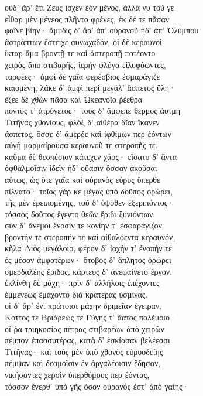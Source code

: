 \begin{pages}
\begin{Leftside}
\quad{}οὐδ' ἄρ' ἔτι Ζεὺς ἴσχεν ἑὸν μένος, ἀλλά νυ τοῦ γε\\
εἶθαρ μὲν μένεος πλῆντο φρένες, ἐκ δέ τε πᾶσαν\\
φαῖνε βίην· ἄμυδις δ' ἄρ' ἀπ' οὐρανοῦ ἠδ' ἀπ' Ὀλύμπου \\
ἀστράπτων ἔστειχε συνωχαδόν, οἱ δὲ κεραυνοὶ  \\
ἴκταρ ἅμα βροντῇ τε καὶ ἀστεροπῇ ποτέοντο\\
χειρὸς ἄπο στιβαρῆς, ἱερὴν φλόγα εἰλυφόωντες, \\
ταρφέες· ἀμφὶ δὲ γαῖα φερέσβιος ἐσμαράγιζε \\
καιομένη, λάκε δ' ἀμφὶ περὶ μεγάλ' ἄσπετος ὕλη·\\
ἔζεε δὲ χθὼν πᾶσα καὶ Ὠκεανοῖο ῥέεθρα \\
πόντός τ' ἀτρύγετος· τοὺς δ' ἄμφεπε θερμὸς ἀυτμὴ \\
Τιτῆνας χθονίους, φλὸξ δ' αἰθέρα δῖαν ἵκανεν\\
ἄσπετος, ὄσσε δ' ἄμερδε καὶ ἰφθίμων περ ἐόντων\\
αὐγὴ μαρμαίρουσα κεραυνοῦ τε στεροπῆς τε.\\
καῦμα δὲ θεσπέσιον κάτεχεν χάος· εἴσατο δ' ἄντα  \\
ὀφθαλμοῖσιν ἰδεῖν ἠδ' οὔασιν ὄσσαν ἀκοῦσαι\\
αὔτως, ὡς ὅτε γαῖα καὶ οὐρανὸς εὐρὺς ὕπερθε \\
πίλνατο· τοῖος γάρ κε μέγας ὑπὸ δοῦπος ὀρώρει, \\
τῆς μὲν ἐρειπομένης, τοῦ δ' ὑψόθεν ἐξεριπόντος· \\
τόσσος δοῦπος ἔγεντο θεῶν ἔριδι ξυνιόντων. \\
σὺν δ' ἄνεμοι ἔνοσίν τε κονίην τ' ἐσφαράγιζον\\
βροντήν τε στεροπήν τε καὶ αἰθαλόεντα κεραυνόν,\\
κῆλα Διὸς μεγάλοιο, φέρον δ' ἰαχήν τ' ἐνοπήν τε\\
ἐς μέσον ἀμφοτέρων· ὄτοβος δ' ἄπλητος ὀρώρει \\
σμερδαλέης ἔριδος, κάρτευς δ' ἀνεφαίνετο ἔργον. \\

\quad{}ἐκλίνθη δὲ μάχη· πρὶν δ' ἀλλήλοις ἐπέχοντες \\
ἐμμενέως ἐμάχοντο διὰ κρατερὰς ὑσμίνας.\\
οἱ δ' ἄρ' ἐνὶ πρώτοισι μάχην δριμεῖαν ἔγειραν, \\
Κόττος τε Βριάρεώς τε Γύγης τ' ἄατος πολέμοιο·\\
οἵ ῥα τριηκοσίας πέτρας στιβαρέων ἀπὸ χειρῶν  \\
πέμπον ἐπασσυτέρας, κατὰ δ' ἐσκίασαν βελέεσσι\\
Τιτῆνας· καὶ τοὺς μὲν ὑπὸ χθονὸς εὐρυοδείης \\
πέμψαν καὶ δεσμοῖσιν ἐν ἀργαλέοισιν ἔδησαν,\\
νικήσαντες χερσὶν ὑπερθύμους περ ἐόντας, \\
τόσσον ἔνερθ' ὑπὸ γῆς ὅσον οὐρανός ἐστ' ἀπὸ γαίης·  \\


\end{Leftside}
\end{pages}
